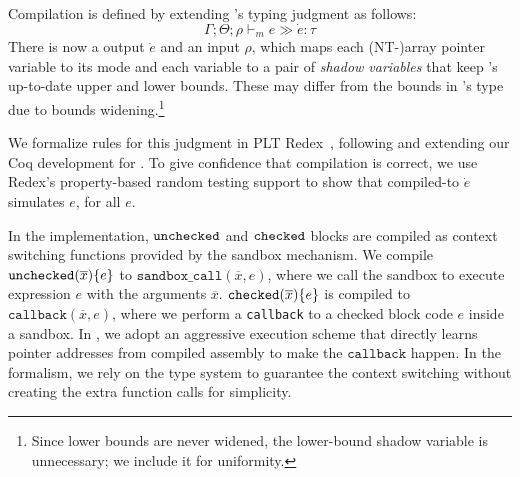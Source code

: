 {Compilation is defined by extending \systemname's
typing judgment as follows:
\[\Gamma;\Theta;\rho \vdash_m e \gg \dot e:\tau\]
There is now a \elang output $\dot e$ and an input $\rho$, which maps
each (NT-)array pointer variable to its mode and
each variable  to a pair of \emph{shadow
  variables} that keep 's up-to-date upper and lower bounds. 
These may differ from the bounds in 's type due to bounds
widening.\footnote{Since lower bounds are never widened, the
  lower-bound shadow variable is unnecessary; we include it for uniformity.} 


We formalize rules for this judgment in PLT Redex~\cite{pltredex},
following and extending our Coq development for \systemname. To give
confidence that compilation is correct, we use Redex's property-based
random testing support to show that compiled-to $\dot e $ simulates
$e$, for all $e$.

%
In the \systemname implementation,
$\mathtt{unchecked}$ and $\mathtt{checked}$ blocks 
are compiled as context switching functions provided by the sandbox mechanism.
We compile $\mathtt{unchecked}({\overline{x}})\{e\}$ to 
$\texttt{sandbox\_call}(\overline{x},e)$, where we call the sandbox 
to execute expression $e$ with the arguments $\overline{x}$.
$\mathtt{checked}({\overline{x}}){\{e\}}$ is compiled to 
$\texttt{callback}(\overline{x},e)$, where we perform 
a \texttt{callback} to a checked block code $e$ inside a sandbox.
In \systemname, we adopt an aggressive execution scheme that
directly learns pointer addresses from compiled assembly to make the $\texttt{callback}$ happen.
In the formalism, we rely on the type system to 
guarantee the context switching without creating the extra function calls for simplicity.


}

